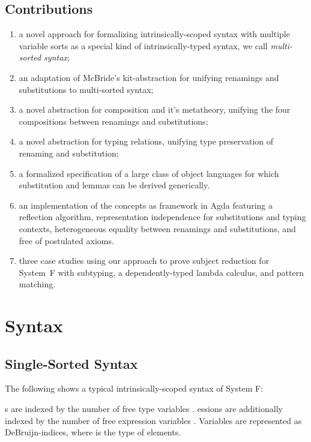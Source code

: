 \documentclass[sigplan,10pt, anonymous]{acmart}
\newenvironment{ExampleCode*}{%
  \begin{tcolorbox}[%
    colframe=white,%
    colback=yellow!5,%
    boxrule=0.0pt,%
    top=2.5pt,%
    left=2.5pt,%
    bottom=2.5pt,%
    right=2.5pt,%
    boxsep=0pt%
  ]\vspace{-0.2\baselineskip}%
}{%
  \vspace{-1\baselineskip}%
  \end{tcolorbox}%
}
\newcommand*\ExampleCode[1]{\begin{ExampleCode*}{#1}\end{ExampleCode*}}
\newcommand*\ACode[1]{\AgdaFontStyle{\textcolor{mygray}{#1}}}
\newcommand*\ACon[1]{\AgdaInductiveConstructor{#1}}
\begin{document}
  \subsection{Contributions}
  \label{sec:introduction:contributions}
  \begin{enumerate}
  \item
    a novel approach for formalizing intrinsically-scoped syntax with
    multiple variable sorts as a special kind of intrinsically-typed
    syntax, we call \emph{multi-sorted syntax};
  \item
    an adaptation of McBride's kit-abstraction for unifying renamings
    and substitutions to multi-sorted syntax;
  \item
    a novel abstraction for composition and it's metatheory, unifying
    the four compositions between renamings and substitutions;
  \item
    a novel abstraction for typing relations, unifying type
    preservation of renaming and substitution;
  \item
    a formalized specification of a large class of object languages
    for which substitution and lemmas can be derived generically.
  \item
    an implementation of the concepts as framework in Agda featuring
    a reflection algorithm, representation independence for
    substitutions and typing contexts, heterogeneous equality between
    renamings and substitutions, and free of postulated axioms.
  \item
    three case studies using our approach to prove subject reduction
    for System~F with subtyping, a dependently-typed lambda calculus, and
    pattern matching.
  \end{enumerate}

  \section{Syntax}
  \label{sec:syntax}
  \subsection{Single-Sorted Syntax}
  \label{sec:syntax:single}
  The following shows a typical intrinsically-scoped syntax of System F:
  \ExampleCode\FUnsortedSyntax

  \ACode{\ACon{Type}}s are indexed by the number of free type
  variables \ACode{n}.
  \ACode{\ACon{Expr}}essions are additionally indexed by the number of
  free expression variables \ACode{m}.
  Variables \ACode{\ACon{`\_}} are represented as DeBruijn-indices, where
  \ACode{\ACon{Fin} n} is the type of \ACode{n} elements.
\end{document}
